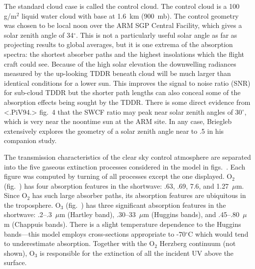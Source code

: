 The standard cloud case is called the control cloud.  
The control cloud is a 100 g/m$^2$ liquid water cloud with base at
1.6~km (900~mb). 
The control geometry was chosen to be local noon over the ARM SGP
Central Facility, which gives a solar zenith angle of 34$^\circ$. 
This is not a particularly useful solar angle as far as projecting
results to global averages, but it is one extrema 
of the absorption spectra: the shortest absorber paths and the highest
insolations which the flight craft could see. 
Because of the high solar elevation the downwelling radiances measured
by the up-looking TDDR beneath cloud will be much larger than
identical conditions for a lower sun. 
This improves the signal to noise ratio (SNR) for sub-cloud
TDDR but the shorter path lengths can also conceal some of the
absorption effects being sought by the TDDR.  
There is some direct evidence
from <.PiV94.> fig.~4 that the SWCF ratio
may peak near solar zenith angles of 30$^\circ$, which is very near 
the noontime sun at the ARM site. 
In any case, Briegleb extensively explores the geometry 
of a solar zenith angle near to .5 in his companion study.


%
\medskip
{}\nobreak

The transmission characteristics of the clear sky control
atmosphere are separated into the five gaseous extinction processes
considered in the model in figs.~.
Each figure was computed by turning of all processes except the one
displayed. 
O$_2$ (fig.~\/) has four absorption features in the shortwave: 
.63, .69, 7.6, and 1.27~$\mu$m. Since O$_2$ has such large absorber
paths, its absorption features are ubiquitous in the troposphere.
O$_3$ (fig.~\/) has three significant absorption features in the shortwave: 
.2--.3~$\mu$m (Hartley band), .30--33~$\mu$m (Huggins bands), and
.45--.80~$\mu$m (Chappuis bands). 
There is a slight temperature dependence to the Huggins bands---this
model employs cross-sections appropriate to -70$^\circ$C which would
tend to underestimate absorption.
Together with the O$_2$ Herzberg continuum (not shown), O$_3$ is
responsible for the extinction of all the incident UV above the
surface. 

